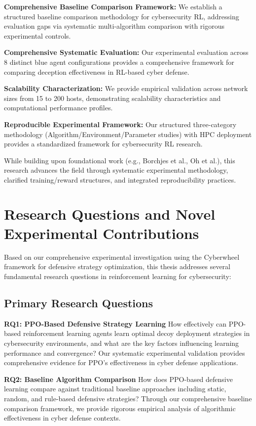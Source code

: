 \documentclass[12pt,oneside,a4paper]{article}
\theoremstyle{definition}
\theoremstyle{plain}
\begin{document}
\textbf{Comprehensive Baseline Comparison Framework:} We establish a structured baseline comparison methodology for cybersecurity RL, addressing evaluation gaps via systematic multi-algorithm comparison with rigorous experimental controls.

\textbf{Comprehensive Systematic Evaluation:} Our experimental evaluation across 8 distinct blue agent configurations provides a comprehensive framework for comparing deception effectiveness in RL-based cyber defense.

\textbf{Scalability Characterization:} We provide empirical validation across network sizes from 15 to 200 hosts, demonstrating scalability characteristics and computational performance profiles.

\textbf{Reproducible Experimental Framework:} Our structured three-category methodology (Algorithm/Environment/Parameter studies) with HPC deployment provides a standardized framework for cybersecurity RL research.

While building upon foundational work (e.g., Borchjes et al., Oh et al.), this research advances the field through systematic experimental methodology, clarified training/reward structures, and integrated reproducibility practices.

\section{Research Questions and Novel Experimental Contributions}

Based on our comprehensive experimental investigation using the Cyberwheel framework for defensive strategy optimization, this thesis addresses several fundamental research questions in reinforcement learning for cybersecurity:

\subsection{Primary Research Questions}

\textbf{RQ1: PPO-Based Defensive Strategy Learning} 
How effectively can PPO-based reinforcement learning agents learn optimal decoy deployment strategies in cybersecurity environments, and what are the key factors influencing learning performance and convergence? Our systematic experimental validation provides comprehensive evidence for PPO's effectiveness in cyber defense applications.

\textbf{RQ2: Baseline Algorithm Comparison}
How does PPO-based defensive learning compare against traditional baseline approaches including static, random, and rule-based defensive strategies? Through our comprehensive baseline comparison framework, we provide rigorous empirical analysis of algorithmic effectiveness in cyber defense contexts.
\end{document}
